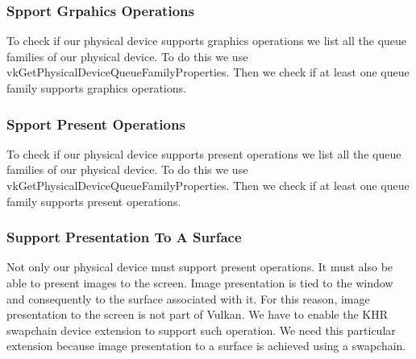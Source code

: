\subsubsection{Spport Grpahics Operations}

To check if our physical device supports graphics operations we list all
the queue families of our physical device.
To do this we use vkGetPhysicalDeviceQueueFamilyProperties.
Then we check if at least one queue family supports graphics operations.

\begin{minipage}{\linewidth}{\noindent}
    
\end{minipage}

\subsubsection{Spport Present Operations}

To check if our physical device supports present operations we list all
the queue families of our physical device.
To do this we use vkGetPhysicalDeviceQueueFamilyProperties.
Then we check if at least one queue family supports present operations.

\begin{minipage}{\linewidth}{\noindent}
    
\end{minipage}

\subsubsection{Support Presentation To A Surface}

Not only our physical device must support present operations.
It must also be able to present images to the screen.
Image presentation is tied to the window and consequently to the surface
associated with it.
For this reason, image presentation to the screen is not part of Vulkan.
We have to enable the KHR swapchain device extension to support such operation.
We need this particular extension because image presentation to a surface is
achieved using a swapchain.

